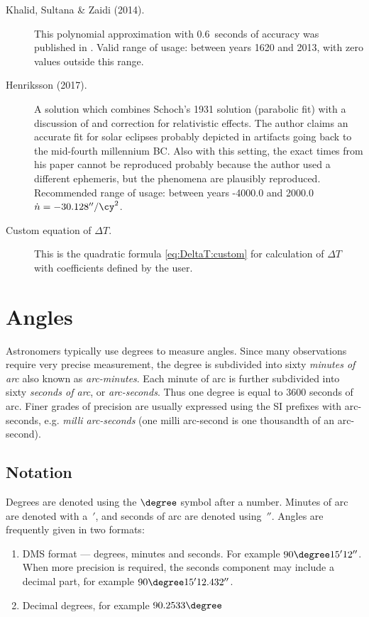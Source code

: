 \begin{description}
\item[Khalid, Sultana \& Zaidi (2014).] This polynomial approximation with 0.6~seconds 
  of accuracy was published in . 
  Valid range of usage: between years 1620 and 2013, with zero values outside this range.

\item[Henriksson (2017).]  A solution which combines Schoch's 1931
  solution (parabolic fit) with a discussion of and correction for relativistic effects.  The author
  claims an accurate fit for solar eclipses probably depicted in artifacts going back to the mid-fourth
  millennium BC.
  Also with this setting, the exact times from his paper \citep{Henriksson:2017} cannot be
  reproduced probably because the author used a different ephemeris, but the phenomena are
  plausibly reproduced.
  Recommended range of usage: between years -4000.0 and 2000.0 $\dot{n}=-30.128''/\cy^2$.

\item[Custom equation of $\Delta T$.] This is the quadratic formula \ref{eq:DeltaT:custom} for
  calculation of $\Delta T$ with coefficients defined by the user.
\end{description}


\section{Angles}
\label{sec:Concepts:Angles}

Astronomers typically use degrees to measure angles. Since many
observations require very precise measurement, the degree is subdivided
into sixty \emph{minutes of arc} also known as \emph{arc-minutes}. Each
minute of arc is further subdivided into sixty \emph{seconds of arc}, or
\emph{arc-seconds}. Thus one degree is equal to 3600 seconds of arc.
Finer grades of precision are usually expressed using the SI prefixes
with arc-seconds, e.g. \emph{milli arc-seconds} (one milli arc-second is
one thousandth of an arc-second).

\subsection{Notation}

Degrees are denoted using the $\degree$ symbol after a number. Minutes of arc are denoted with a~$'$, and seconds of arc are denoted using~$''$. Angles are frequently given in two formats:

\begin{enumerate}
\item
  DMS format --- degrees, minutes and seconds. For example $90\degree15'12''$.
  When more precision is required, the seconds component may include a
  decimal part, for example $90\degree15'12.432''$.
\item
  Decimal degrees, for example $90.2533\degree$
\end{enumerate}

